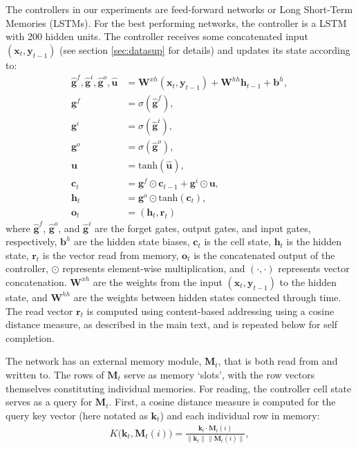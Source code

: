 \documentclass{article}
\begin{document}
The controllers in our experiments are feed-forward networks or Long Short-Term Memories (LSTMs). For the best performing networks, the controller is a LSTM with 200 hidden units. The controller receives some concatenated input $(\mathbf{x}_t, \mathbf{y}_{t-1})$ (see section \ref{sec:datasup} for details) and updates its state according to:
\begin{align}
    \mathbf{\hat{g}}^f, \mathbf{\hat{g}}^i, \mathbf{\hat{g}}^o, \mathbf{\hat{u}} &= \mathbf{W}^{xh}(\mathbf{x}_t, \mathbf{y}_{t-1}) + \mathbf{W}^{hh}\mathbf{h}_{t-1} + \mathbf{b}^h, \\
    \mathbf{g}^f &= \sigma(\mathbf{\hat{g}}^f), \\
    \mathbf{g}^i &= \sigma(\mathbf{\hat{g}}^i), \\
    \mathbf{g}^o &= \sigma(\mathbf{\hat{g}}^o), \\
    \mathbf{u} &= \text{tanh}(\mathbf{\hat{u}}), \\
    \mathbf{c}_t &= \mathbf{g}^f \odot \mathbf{c}_{t-1} + \mathbf{g}^i \odot \mathbf{u}, \\
    \mathbf{h}_t &= \mathbf{g}^o \odot \text{tanh}(\mathbf{c}_t), \\
    \mathbf{o}_t &= (\mathbf{h}_t, \mathbf{r}_t)
\end{align}
where $\mathbf{\hat{g}}^f$, $\mathbf{\hat{g}}^o$, and $\mathbf{\hat{g}}^i$ are the forget gates, output gates, and input gates, respectively, $\mathbf{b}^h$ are the hidden state biases, $\mathbf{c}_t$ is the cell state, $\mathbf{h}_t$ is the hidden state, $\mathbf{r}_t$ is the vector read from memory, $\mathbf{o}_t$ is the concatenated output of the controller, $\odot$ represents element-wise multiplication, and $(\cdot,\cdot)$ represents vector concatenation. $\mathbf{W}^{xh}$ are the weights from the input $(\mathbf{x}_t, \mathbf{y}_{t-1})$ to the hidden state, and $\mathbf{W}^{hh}$ are the weights between hidden states connected through time. The read vector $\mathbf{r}_t$ is computed using content-based addressing using a cosine distance measure, as described in the main text, and is repeated below for self completion.

The network has an external memory module, $\mathbf{M}_t$, that is both read from and written to. The rows of $\mathbf{M}_t$ serve as memory `slots', with the row vectors themselves constituting individual memories. For reading, the controller cell state serves as a query for $\mathbf{M}_t$. First, a cosine distance measure is computed for the query key vector (here notated as $\mathbf{k}_t$) and each individual row in memory:
\begin{align}
    K\big(\mathbf{k}_t, \mathbf{M}_{t}(i)\big) = \frac{\mathbf{k}_t \cdot \mathbf{M}_{t}(i)}{\parallel\mathbf{k}_t\parallel\parallel\mathbf{M}_{t}(i)\parallel},
\end{align}
\end{document}
